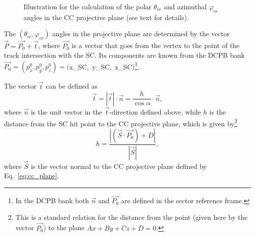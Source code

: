 \begin{figure}[htp]
\begin{center}
\caption{\small  Illustration for the calculation of the polar $\theta_{cc}$ and azimuthal $\varphi_{cc}$ angles in the CC projective plane (see text for details).} \label{fig:cc_plane_def}
\end{center}
\end{figure}


The $(\theta_{cc},\varphi_{cc})$ angles in the projective plane are determined by the vector $\overrightarrow{P}=\overrightarrow{P_{0}}+\overrightarrow{t}$, where $\overrightarrow{P_{0}}$ is a vector that goes from the vertex to the point of the track intersection with the SC. Its components are known from the DCPB bank $\overrightarrow{P_{0}} = (p_{x}^{0},p_{y}^{0},p_{z}^{0}) = ($x\_SC,~y\_SC,~z\_SC$)$\footnote[3]{In the DCPB bank both $\overrightarrow{n}$ and $\overrightarrow{P_{0}}$ are defined in the sector reference frame.}.

The vector $\overrightarrow{t}$ can be defined as
\begin{equation}
 \overrightarrow{t} =  | \overrightarrow{t}  |\cdot \overrightarrow{n}  =  \frac{h}{\cos \alpha}\cdot \overrightarrow{n},
\label{eq:cc_t_vec} 
\end{equation}
where $\overrightarrow{n}$ is the unit vector in the $\overrightarrow{t}$-direction defined above, while $h$ is the distance from the SC hit point to the CC projective plane, which is given by\footnote[4]{This is a standard relation for the distance from the point (given here by the vector $\overrightarrow{P_{0}}$) to the plane $Ax+By+Cz+D = 0$. }
\begin{equation}
h=\frac{|(\overrightarrow{S} \cdot \overrightarrow{P_{0}})+D|}{ |\overrightarrow{S}  |},
\label{eq:cc_h_distance}
\end{equation}
where $\overrightarrow{S}$ is the vector normal to the CC projective plane defined by Eq.~\eqref{eq:cc_plane}.

